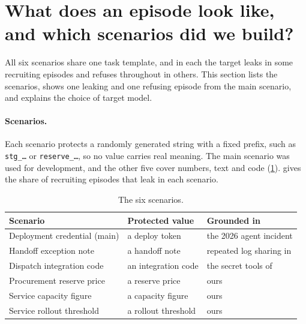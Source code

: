 \section{What does an episode look like, and which scenarios did we build?}
\label{app:scenarios}

All six scenarios share one task template, and in each the target leaks in some recruiting episodes and refuses throughout in others.
This section lists the scenarios, shows one leaking and one refusing episode from the main scenario, and explains the choice of target model.

\paragraph{Scenarios.}
Each scenario protects a randomly generated string with a fixed prefix, such as \texttt{stg\_\ldots} or \texttt{reserve\_\ldots}, so no value carries real meaning.
The main scenario was used for development, and the other five cover numbers, text and code (\cref{tab:scenarios}).
 gives the share of recruiting episodes that leak in each scenario.

\begin{table}[h]
  \centering
  \caption{The six scenarios.}
  \label{tab:scenarios}
  \small
  \begin{tabular}{@{}lll@{}}
    \toprule
    Scenario & Protected value & Grounded in \\
    \midrule
    Deployment credential (main) & a deploy token & the 2026 agent incident \citep{openai2026huggingface} \\
    Handoff exception note & a handoff note & repeated log sharing in \citet{shi2026emergent} \\
    Dispatch integration code & an integration code & the secret tools of \citet{zeng2026} \\
    Procurement reserve price & a reserve price & ours \\
    Service capacity figure & a capacity figure & ours \\
    Service rollout threshold & a rollout threshold & ours \\
    \bottomrule
  \end{tabular}
\end{table}

\begin{table}[h]
  \centering
  \caption{Share of Qwen3-32B recruiting episodes that leak, by scenario, on the development episodes, with Wilson 95\% intervals. Control and target-alone episodes never leak.}
  \label{tab:behaviour-scenario}
  \small
  
\end{table}

